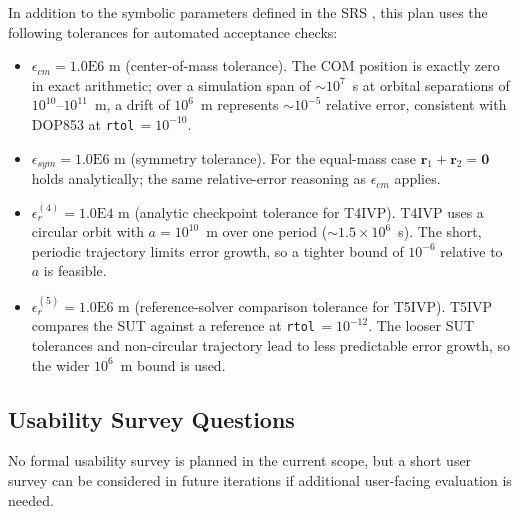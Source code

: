 \documentclass[12pt, titlepage]{article}
\begin{document}
In addition to the symbolic parameters defined in the SRS \citep{SRS}, this
plan uses the following tolerances for automated acceptance checks:
\begin{itemize}
  \item $\epsilon_{cm}=1.0\mathrm{E}6$ m (center-of-mass tolerance).
  The COM position is exactly zero in exact arithmetic; over a simulation span
  of $\sim10^{7}$~s at orbital separations of $10^{10}$--$10^{11}$~m, a drift
  of $10^{6}$~m represents $\sim10^{-5}$ relative error, consistent with
  DOP853 at \texttt{rtol}$\,=10^{-10}$.

  \item $\epsilon_{sym}=1.0\mathrm{E}6$ m (symmetry tolerance).
  For the equal-mass case $\mathbf{r}_1+\mathbf{r}_2=\mathbf{0}$ holds
  analytically; the same relative-error reasoning as $\epsilon_{cm}$ applies.

  \item $\epsilon_r^{(4)}=1.0\mathrm{E}4$ m (analytic checkpoint tolerance for
  T4IVP).
  T4IVP uses a circular orbit with $a=10^{10}$~m over one period
  ($\sim1.5\times10^{6}$~s). The short, periodic trajectory limits error
  growth, so a tighter bound of $10^{-6}$ relative to $a$ is feasible.

  \item $\epsilon_r^{(5)}=1.0\mathrm{E}6$ m (reference-solver comparison
  tolerance for T5IVP).
  T5IVP compares the SUT against a reference at \texttt{rtol}$\,=10^{-12}$.
  The looser SUT tolerances and non-circular trajectory lead to less
  predictable error growth, so the wider $10^{6}$~m bound is used.
\end{itemize}

\subsection{Usability Survey Questions}

No formal usability survey is planned in the current scope, but a short user
survey can be considered in future iterations if additional user-facing
evaluation is needed.

\newpage{}
\end{document}
